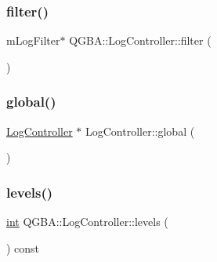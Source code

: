 \subsubsection{\texorpdfstring{filter()}{filter()}}
{\footnotesize\ttfamily m\+Log\+Filter$\ast$ Q\+G\+B\+A\+::\+Log\+Controller\+::filter (\begin{DoxyParamCaption}{ }\end{DoxyParamCaption})\hspace{0.3cm}{\ttfamily [inline]}}

\mbox{\label{class_q_g_b_a_1_1_log_controller_af87a7afca6aada1e2c908912072e73fd}} 
\subsubsection{\texorpdfstring{global()}{global()}}
{\footnotesize\ttfamily \mbox{\hyperlink{class_q_g_b_a_1_1_log_controller}{Log\+Controller}} $\ast$ Log\+Controller\+::global (\begin{DoxyParamCaption}{ }\end{DoxyParamCaption})\hspace{0.3cm}{\ttfamily [static]}}

\mbox{\label{class_q_g_b_a_1_1_log_controller_ac08583e6a38da30e249e8b4854425a54}} 
\subsubsection{\texorpdfstring{levels()}{levels()}}
{\footnotesize\ttfamily \mbox{\hyperlink{ioapi_8h_a787fa3cf048117ba7123753c1e74fcd6}{int}} Q\+G\+B\+A\+::\+Log\+Controller\+::levels (\begin{DoxyParamCaption}{ }\end{DoxyParamCaption}) const\hspace{0.3cm}{\ttfamily [inline]}}

